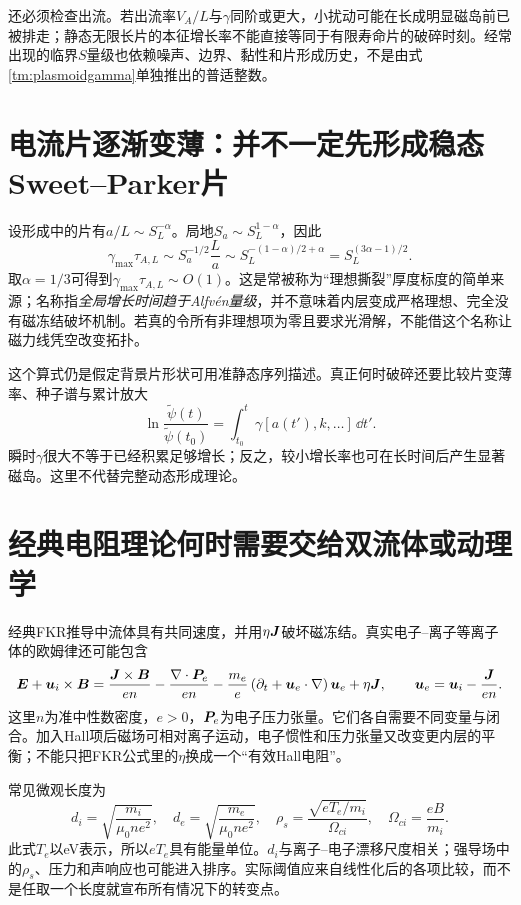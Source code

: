还必须检查出流。若出流率$V_A/L$与$\gamma$同阶或更大，小扰动可能在长成明显磁岛前已被排走；静态无限长片的本征增长率不能直接等同于有限寿命片的破碎时刻。经常出现的临界$S$量级也依赖噪声、边界、黏性和片形成历史，不是由式\eqref{tm:plasmoidgamma}单独推出的普适整数。

\section{电流片逐渐变薄：并不一定先形成稳态Sweet--Parker片}
设形成中的片有$a/L\sim S_L^{-\alpha}$。局地$S_a\sim S_L^{1-\alpha}$，因此
\begin{equation}
 \gamma_{\max}\tau_{A,L}
 \sim S_a^{-1/2}\frac La
 \sim S_L^{-(1-\alpha)/2+\alpha}
 =S_L^{(3\alpha-1)/2}.
\end{equation}
取$\alpha=1/3$可得到$\gamma_{\max}\tau_{A,L}\sim O(1)$。这是常被称为“理想撕裂”厚度标度的简单来源；名称指\emph{全局增长时间趋于Alfv\'en量级}，并不意味着内层变成严格理想、完全没有磁冻结破坏机制。若真的令所有非理想项为零且要求光滑解，不能借这个名称让磁力线凭空改变拓扑。

这个算式仍是假定背景片形状可用准静态序列描述。真正何时破碎还要比较片变薄率、种子谱与累计放大
\begin{equation}
 \ln\frac{\widetilde\psi(t)}{\widetilde\psi(t_0)}
 =\int_{t_0}^{t}\gamma[a(t'),k,\ldots]\,\dd t'.
\end{equation}
瞬时$\gamma$很大不等于已经积累足够增长；反之，较小增长率也可在长时间后产生显著磁岛。这里不代替完整动态形成理论。

\section{经典电阻理论何时需要交给双流体或动理学}
经典FKR推导中流体具有共同速度，并用$\eta\bm{J}$破坏磁冻结。真实电子--离子等离子体的欧姆律还可能包含
\begin{equation}
 \bm{E}+\bm{u}_i\times\bm{B}
 =\frac{\bm{J}\times\bm{B}}{en}
 -\frac{\nabla\cdot\bm{P}_e}{en}
 -\frac{m_e}{e}\left(\partial_t+\bm{u}_e\cdot\nabla\right)\bm{u}_e
 +\eta\bm{J},\qquad
 \bm{u}_e=\bm{u}_i-\frac{\bm{J}}{en}.
\end{equation}
这里$n$为准中性数密度，$e>0$，$\bm{P}_e$为电子压力张量。它们各自需要不同变量与闭合。加入Hall项后磁场可相对离子运动，电子惯性和压力张量又改变更内层的平衡；不能只把FKR公式里的$\eta$换成一个“有效Hall电阻”。

常见微观长度为
\begin{equation}
 d_i=\sqrt{\frac{m_i}{\mu_0ne^2}},\quad
 d_e=\sqrt{\frac{m_e}{\mu_0ne^2}},\quad
 \rho_s=\frac{\sqrt{eT_e/m_i}}{\Omega_{ci}},\quad
 \Omega_{ci}=\frac{eB}{m_i}.
\end{equation}
此式$T_e$以eV表示，所以$eT_e$具有能量单位。$d_i$与离子--电子漂移尺度相关；强导场中的$\rho_s$、压力和声响应也可能进入排序。实际阈值应来自线性化后的各项比较，而不是任取一个长度就宣布所有情况下的转变点。\citep{TMHall2011}

